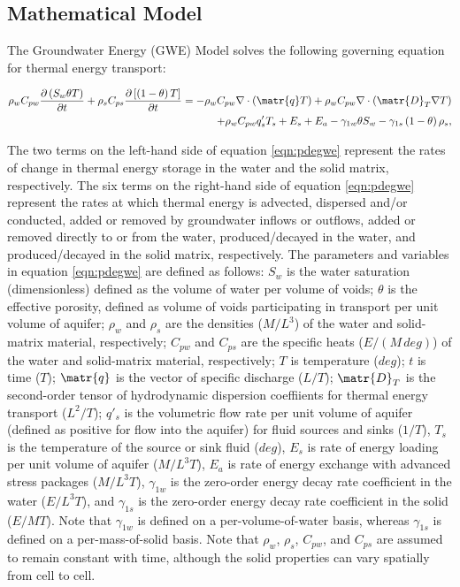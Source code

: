 \subsection{Mathematical Model} \label{sec:mathmodel}

The Groundwater Energy (GWE) Model solves the following governing equation for thermal energy transport:

\begin{equation}
\label{eqn:pdegwe}
\begin{aligned}
\rho_w C_{pw} \frac {\partial \left ( S_w \theta T \right )}{\partial t}
+ \rho_s C_{ps} \frac {\partial \left [ \left (1 - \theta \right ) T \right ]}{\partial t}
= - \rho_w C_{pw} \nabla \cdot \left ( \matr{q} T  \right ) 
+ \rho_w C_{pw} \nabla \cdot \left ( \matr{D}_T \nabla T \right )\\
+ \rho_w C_{pw} q'_s T_s + E_s + E_a - \gamma_{1w} \theta S_w
- \gamma_{1s} \left (1 - \theta \right ) \rho_s,
\end{aligned}
\end{equation}

\noindent The two terms on the left-hand side of equation \ref{eqn:pdegwe} represent the rates of change in thermal energy storage in the water and the solid matrix, respectively. The six terms on the right-hand side of equation \ref{eqn:pdegwe} represent the rates at which thermal energy is advected, dispersed and/or conducted, added or removed by groundwater inflows or outflows, added or removed directly to or from the water, produced/decayed in the water, and produced/decayed in the solid matrix, respectively. The parameters and variables in equation \ref{eqn:pdegwe} are defined as follows: $S_w$ is the water saturation (dimensionless) defined as the volume of water per volume of voids; $\theta$ is the effective porosity, defined as volume of voids participating in transport per unit volume of aquifer; $\rho_w$ and $\rho_s$ are the densities ($M/L^3$) of the water and solid-matrix material, respectively; $C_{pw}$ and $C_{ps}$ are the specific heats ($E/(M \, deg)$) of the water and solid-matrix material, respectively; $T$ is temperature ($deg$); $t$ is time ($T$); $\matr{q}$ is the vector of specific discharge ($L/T$); $\matr{D}_T$ is the second-order tensor of hydrodynamic dispersion coeffiients for thermal energy transport ($L^2/T$); $q'_s$ is the volumetric flow rate per unit volume of aquifer (defined as positive for flow into the aquifer) for fluid sources and sinks ($1/T$), $T_s$ is the temperature of the source or sink fluid ($deg$), $E_s$ is rate of energy loading per unit volume of aquifer ($M/L^3T$), $E_a$ is rate of energy exchange with advanced stress packages ($M/L^3T$), $\gamma_{1w}$ is the zero-order energy decay rate coefficient in the water ($E/L^3T$), and $\gamma_{1s}$ is the zero-order energy decay rate coefficient in the solid ($E/MT$). Note that $\gamma_{1w}$ is defined on a per-volume-of-water basis, whereas $\gamma_{1s}$ is defined on a per-mass-of-solid basis. Note that $\rho_w$, $\rho_s$, $C_{pw}$, and $C_{ps}$ are assumed to remain constant with time, although the solid properties can vary spatially from cell to cell.

